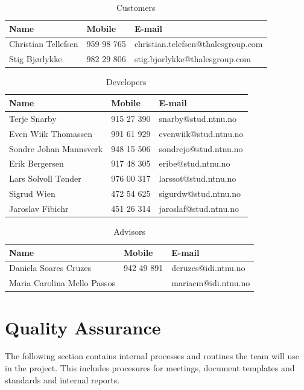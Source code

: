 \begin{table}[!htb] \footnotesize \center
\caption{Customers\label{tab:plan:customer}}
\begin{tabular}{l l l}
	\toprule
	Name & Mobile & E-mail \\ 
	\midrule
	Christian Tellefsen & 959 98 765 & christian.telefsen@thalesgroup.com \\ 
	Stig Bjørlykke & 982 29 806 & stig.bjorlykke@thalesgroup.com \\ 
	\bottomrule
\end{tabular}
\end{table}

\begin{table}[!htb] \footnotesize \center
\caption{Developers\label{tab:plan:devs}}
\begin{tabular}{l l l}
	\toprule
	Name & Mobile & E-mail  \\ 
	\midrule
	Terje Snarby & 915 27 390 & snarby@stud.ntnu.no \\ 
	Even Wiik Thomassen & 991 61 929 & evenwiik@stud.ntnu.no \\ 
	Sondre Johan Mannsverk & 948 15 506 & sondrejo@stud.ntnu.no \\ 
	Erik Bergersen & 917 48 305 & eribe@stud.ntnu.no \\ 
	Lars Solvoll Tønder & 976 00 317 & larssot@stud.ntnu.no \\ 
	Sigrud Wien & 472 54 625 & sigurdw@stud.ntnu.no \\ 
	Jaroslav Fibichr & 451 26 314 & jaroslaf@stud.ntnu.no \\ 
	\bottomrule
\end{tabular}
\end{table}

\begin{table}[!htb] \footnotesize \center
\caption{Advisors\label{tab:plan:advisors}}
\begin{tabular}{l l l}
	\toprule
	Name & Mobile & E-mail \\ 
	\midrule
	Daniela Soares Cruzes & 942 49 891 & dcruzes@idi.ntnu.no \\ 
	Maria Carolina Mello Passos & & mariacm@idi.ntnu.no \\ 
	\bottomrule
\end{tabular}
\end{table}


\section{Quality Assurance}
\label{sec:plan:qa}
The following section contains internal processes and routines the team will use in the project. This includes procesures for meetings, document templates and standards and internal reports.

